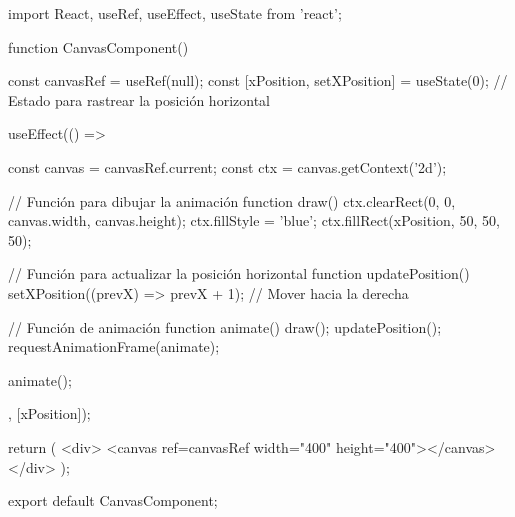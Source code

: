 import React, { useRef, useEffect, useState } from 'react';

function CanvasComponent() {
  const canvasRef = useRef(null);
  const [xPosition, setXPosition] = useState(0); // Estado para rastrear la posición horizontal

  useEffect(() => {
    const canvas = canvasRef.current;
    const ctx = canvas.getContext('2d');

    // Función para dibujar la animación
    function draw() {
      ctx.clearRect(0, 0, canvas.width, canvas.height);
      ctx.fillStyle = 'blue';
      ctx.fillRect(xPosition, 50, 50, 50);
    }

    // Función para actualizar la posición horizontal
    function updatePosition() {
      setXPosition((prevX) => prevX + 1); // Mover hacia la derecha
    }

    // Función de animación
    function animate() {
      draw();
      updatePosition();
      requestAnimationFrame(animate);
    }

    animate();
  }, [xPosition]);

  return (
    <div>
      <canvas ref={canvasRef} width="400" height="400"></canvas>
    </div>
  );
}

export default CanvasComponent;
